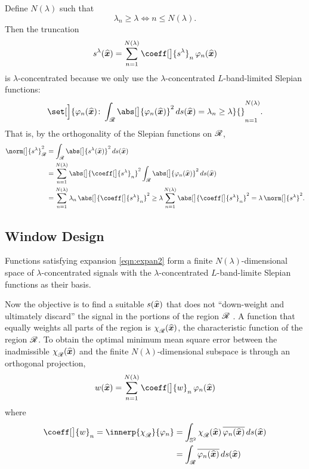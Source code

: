 \documentclass[10pt, twocolumn, twoside]{IEEEtran}
\newcommand{\untsph}{\mathbb{S}^{2}} %
\newcommand{\unit}[1]{\widehat{\bm{#1}}}
\newcommand{\conj}[1]{\overline{#1}} %
\begin{document}
Define $N(\lambda)$ such that
\begin{equation}
\label{eqn:lambda}
\lambda_{n}\geq \lambda \iff n\leq N(\lambda).
\end{equation}
Then the truncation
\begin{equation}
\label{eqn:expan2}
\bandt(\unit{x}) =
\sum_{n=1}^{N(\lambda)} \coeff[\big]{\bandt}_n\,\varphi_n(\unit{x})
\end{equation}
is $\lambda$-concentrated because we only use the $\lambda$-concentrated $L$-band-limited Slepian functions:
\[
\set[\Big]{\varphi_n(\unit{x})\colon
\int_{\R}\abs[\big]{\varphi_n(\unit{x})}^2\,ds(\unit{x}) = \lambda_n \geq \lambda}{\vphantom{\sum}}_{n=1}^{N(\lambda)}.
\]
That is, by the orthogonality of the Slepian functions on $\mathscr{R}$,
\begin{align*}
\norm[\big]{\bandt}_{\R}^2 &= \int_{\R} \abs[\big]{\bandt(\unit{x})}^{2}\,ds(\unit{x}) \\
&= \sum_{n=1}^{N(\lambda)} \abs[\big]{\coeff[\big]{\bandt}_n}^{2}
\int_{\R}\abs[\big]{\varphi_n(\unit{x})}^2\,ds(\unit{x}) \\
&= \sum_{n=1}^{N(\lambda)} \lambda_{n}\,\abs[\big]{\coeff[\big]{\bandt}_n}^{2}
\geq \lambda\sum_{n=1}^{N(\lambda)}\abs[\big]{\coeff[\big]{\bandt}_n}^{2} = \lambda\, \norm[\big]{\bandt}^2.
\end{align*}

\subsection{Window Design}

Functions satisfying expansion \eqref{eqn:expan2} form a finite $N(\lambda)$-dimensional space of $\lambda$-concentrated signals with the $\lambda$-concentrated $L$-band-limite Slepian functions as their basis.

Now the objective is to find a suitable $\band(\unit{x})$ that does not ``down-weight and ultimately discard'' the signal in the portions of the region $\mathscr{R}$ \cite{Wieczorek:2005}.  A function that equally weights all parts of the region is $\chi_{\R}^{\vphantom{g}}(\unit{x})$, the characteristic function of the region $\mathscr{R}$.  To obtain the optimal minimum mean square error between the inadmissible $\chi_{\R}^{\vphantom{g}}(\unit{x})$ and the finite $N(\lambda)$-dimensional subspace is through an orthogonal projection,
\begin{equation}
\taper(\unit{x}) = \sum_{n=1}^{N(\lambda)} \coeff[\big]{\taper}_n\,\varphi_n(\unit{x})
\end{equation}
where
\begin{align}
\coeff[\big]{\taper}_n = \innerp{\chi_{\R}^{\vphantom{g}}}{\varphi_n}
&= \int_{\untsph} \chi_{\R}^{\vphantom{g}}(\unit{x})\, \conj{\varphi_n(\unit{x})}\,ds(\unit{x}) \nonumber \\
&= \int_{\R} \conj{\varphi_n(\unit{x})}\,ds(\unit{x})
\end{align}


\end{document}
